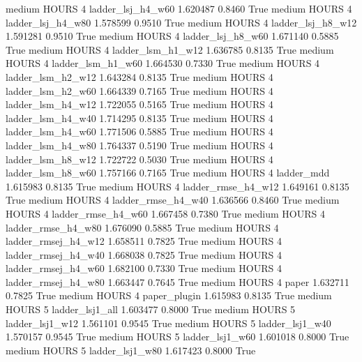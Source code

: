     medium    HOURS                 4   ladder_lsj_h4_w60   1.620487      0.8460    True
    medium    HOURS                 4   ladder_lsj_h4_w80   1.578599      0.9510    True
    medium    HOURS                 4   ladder_lsj_h8_w12   1.591281      0.9510    True
    medium    HOURS                 4   ladder_lsj_h8_w60   1.671140      0.5885    True
    medium    HOURS                 4   ladder_lsm_h1_w12   1.636785      0.8135    True
    medium    HOURS                 4   ladder_lsm_h1_w60   1.664530      0.7330    True
    medium    HOURS                 4   ladder_lsm_h2_w12   1.643284      0.8135    True
    medium    HOURS                 4   ladder_lsm_h2_w60   1.664339      0.7165    True
    medium    HOURS                 4   ladder_lsm_h4_w12   1.722055      0.5165    True
    medium    HOURS                 4   ladder_lsm_h4_w40   1.714295      0.8135    True
    medium    HOURS                 4   ladder_lsm_h4_w60   1.771506      0.5885    True
    medium    HOURS                 4   ladder_lsm_h4_w80   1.764337      0.5190    True
    medium    HOURS                 4   ladder_lsm_h8_w12   1.722722      0.5030    True
    medium    HOURS                 4   ladder_lsm_h8_w60   1.757166      0.7165    True
    medium    HOURS                 4          ladder_mdd   1.615983      0.8135    True
    medium    HOURS                 4  ladder_rmse_h4_w12   1.649161      0.8135    True
    medium    HOURS                 4  ladder_rmse_h4_w40   1.636566      0.8460    True
    medium    HOURS                 4  ladder_rmse_h4_w60   1.667458      0.7380    True
    medium    HOURS                 4  ladder_rmse_h4_w80   1.676090      0.5885    True
    medium    HOURS                 4 ladder_rmsej_h4_w12   1.658511      0.7825    True
    medium    HOURS                 4 ladder_rmsej_h4_w40   1.668038      0.7825    True
    medium    HOURS                 4 ladder_rmsej_h4_w60   1.682100      0.7330    True
    medium    HOURS                 4 ladder_rmsej_h4_w80   1.663447      0.7645    True
    medium    HOURS                 4               paper   1.632711      0.7825    True
    medium    HOURS                 4        paper_plugin   1.615983      0.8135    True
    medium    HOURS                 5     ladder_lsj1_all   1.603477      0.8000    True
    medium    HOURS                 5     ladder_lsj1_w12   1.561101      0.9545    True
    medium    HOURS                 5     ladder_lsj1_w40   1.570157      0.9545    True
    medium    HOURS                 5     ladder_lsj1_w60   1.601018      0.8000    True
    medium    HOURS                 5     ladder_lsj1_w80   1.617423      0.8000    True

